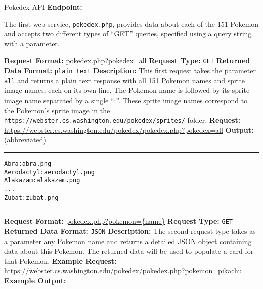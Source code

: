 \documentclass[programming]{../../../../mfcs}
\begin{document}
\vspace{2em}
\begin{question}{Pokedex API}
\textbf{Endpoint:} \texttt{\textbf{\color{colour}{https://webster.cs.washington.edu/pokedex/pokedex.php}}}
\newline

The first web service, \texttt{pokedex.php}, provides data about each of the 151 Pokemon and accepts two different types of ``GET'' queries, specified using a query string with a parameter.
\newline

  \textbf{Request Format:} \url{pokedex.php?pokedex=all}
  \newline
  \textbf{Request Type:} \texttt{GET}
  \newline
  \textbf{Returned Data Format:} \texttt{plain text}
  \newline
  \textbf{Description:} This first request takes the parameter \texttt{all} and returns a plain text
  response with all 151 Pokemon names and sprite image names, each on its own line. The Pokemon name is
  followed by its sprite image name separated by a single ``:''. These sprite image names correspond
  to the Pokemon's sprite image in the \texttt{https://webster.cs.washington.edu/pokedex/sprites/}
  folder.
  \newline
  \textbf{Request:}
  \url{https://webster.cs.washington.edu/pokedex/pokedex.php?pokedex=all}
  \newline
  \textbf{Output:} (abbreviated)
\newline
\hrule
\begin{lstlisting}
Abra:abra.png
Aerodactyl:aerodactyl.png
Alakazam:alakazam.png
...
Zubat:zubat.png
\end{lstlisting}
\hrule
\newpage
{}
  \textbf{Request Format:} \url{pokedex.php?pokemon={name}}
  \newline
  \textbf{Request Type:} \texttt{GET}
  \newline
  \textbf{Returned Data Format:} \texttt{JSON}
  \newline
  \textbf{Description:} The second request type takes as a parameter any Pokemon name and returns
  a detailed JSON object containing data about this Pokemon. The returned data will be used to
  populate a card for that Pokemon. 
  \newline
  \textbf{Example Request:} \url{https://webster.cs.washington.edu/pokedex/pokedex.php?pokemon=pikachu}
  \newline
  \textbf{Example Output:}
\vspace{1em}


\end{question}
\end{document}
